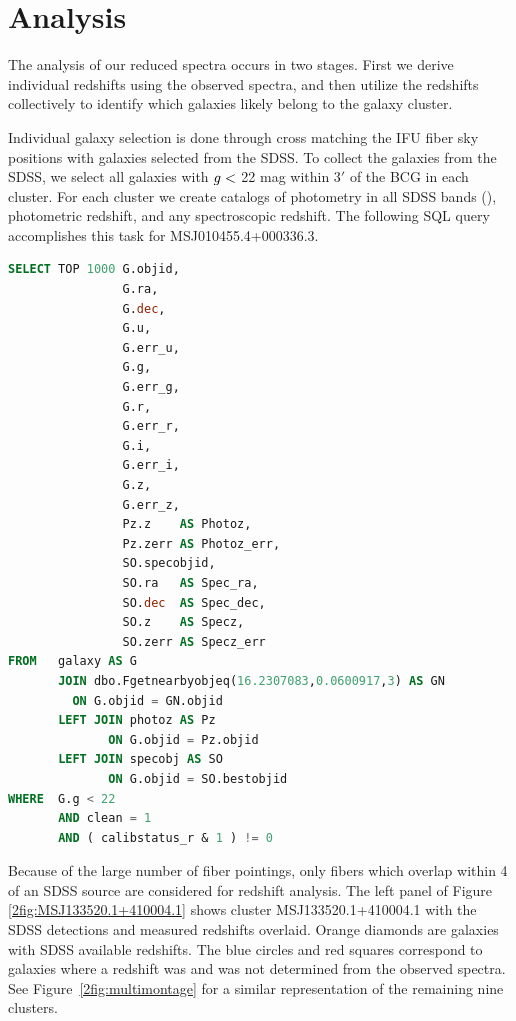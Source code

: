 \section{Analysis}\label{2sec:analysis} 
The analysis of our reduced spectra occurs in two stages. First we derive individual redshifts using the observed spectra, and then utilize the redshifts collectively to identify which galaxies likely belong to the galaxy cluster.

Individual galaxy selection is done through cross matching the IFU fiber sky positions with galaxies selected from the SDSS. To collect the galaxies from the SDSS, we select all galaxies with $\hbox{$g$} <$ 22 mag within $3'$ of the BCG in each cluster. For each cluster we create catalogs of photometry in all SDSS bands (\sdssu\sdssg\sdssr\sdssi\sdssz), photometric redshift, and any spectroscopic redshift. The following SQL query accomplishes this task for MSJ010455.4+000336.3.
\begin{singlespace}
\begin{lstlisting}[language=SQL]
SELECT TOP 1000 G.objid, 
                G.ra, 
                G.dec, 
                G.u, 
                G.err_u, 
                G.g, 
                G.err_g, 
                G.r, 
                G.err_r, 
                G.i, 
                G.err_i, 
                G.z, 
                G.err_z, 
                Pz.z    AS Photoz, 
                Pz.zerr AS Photoz_err, 
                SO.specobjid, 
                SO.ra   AS Spec_ra, 
                SO.dec  AS Spec_dec, 
                SO.z    AS Specz, 
                SO.zerr AS Specz_err 
FROM   galaxy AS G 
       JOIN dbo.Fgetnearbyobjeq(16.2307083,0.0600917,3) AS GN 
         ON G.objid = GN.objid 
       LEFT JOIN photoz AS Pz 
              ON G.objid = Pz.objid 
       LEFT JOIN specobj AS SO 
              ON G.objid = SO.bestobjid 
WHERE  G.g < 22 
       AND clean = 1 
       AND ( calibstatus_r & 1 ) != 0
\end{lstlisting}
\end{singlespace}

Because of the large number of fiber pointings, only fibers which overlap within 4 of an SDSS source are considered for redshift analysis. The left panel of Figure \ref{2fig:MSJ133520.1+410004.1} shows cluster MSJ133520.1+410004.1 with the SDSS detections and measured redshifts overlaid. Orange diamonds are galaxies with SDSS available redshifts. The blue circles and red squares correspond to galaxies where a redshift was and was not determined from the observed spectra. See Figure~\ref{2fig:multimontage} for a similar representation of the remaining nine clusters.

